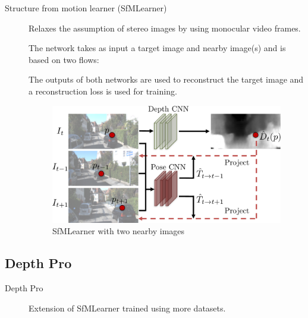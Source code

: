 \begin{description}
    \item[Structure from motion learner (SfMLearner)] 
        Relaxes the assumption of stereo images by using monocular video frames.

        The network takes as input a target image and nearby image(s) and is based on two flows:
        The outputs of both networks are used to reconstruct the target image and a reconstruction loss is used for training.

        \begin{figure}[H]
            \centering
            \includegraphics[width=0.5\linewidth]{./img/_sfmlearner.pdf}
            \caption{SfMLearner with two nearby images}
        \end{figure}
\end{description}


\subsection{Depth Pro}

\begin{description}
    \item[Depth Pro] 
        Extension of SfMLearner trained using more datasets.
\end{description}